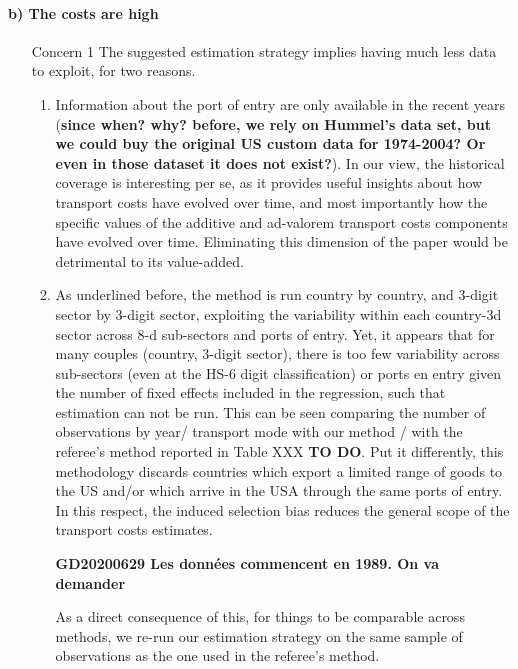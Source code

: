 \documentclass[a4paper,12pt]{article}
\begin{document}
\paragraph{b) The costs are high}
\begin{itemize}
\item[Concern 1] The suggested estimation strategy implies having much less data to exploit, for two reasons.
\begin{enumerate}
\item Information about the port of entry are only available in the recent years (\textbf{since when? why? before, we rely on Hummel's data set, but we could buy the original US custom data for 1974-2004? Or even in those dataset it does not exist?}). In our view, the historical coverage is interesting per se, as it provides useful insights about how transport costs have evolved over time, and most importantly how the specific values of the additive and ad-valorem transport costs components have evolved over time. Eliminating this dimension of the paper would be detrimental to its value-added.
\item As underlined before, the method is run country by country, and 3-digit sector by 3-digit sector, exploiting the variability within each country-3d sector across 8-d sub-sectors and ports of entry. Yet, it appears that for many couples (country, 3-digit sector), there is too few variability across sub-sectors (even at the HS-6 digit classification) or ports en entry given the number of fixed effects included in the regression, such that estimation can not be run. This can be seen comparing the number of observations by year/ transport mode with our method / with the referee's method reported in Table XXX \textbf{TO DO}. Put it differently, this methodology discards countries which export a limited range of goods to the US and/or which arrive in the USA through the same ports of entry. In this respect, the induced selection bias reduces the general scope of the transport costs estimates.

\textbf{GD20200629 Les données commencent en 1989. On va demander}

    As a direct consequence of this, for things to be comparable across methods, we re-run our estimation strategy on the same sample of observations as the one used in the referee's method.


\end{enumerate}
\end{itemize}
\end{document}
